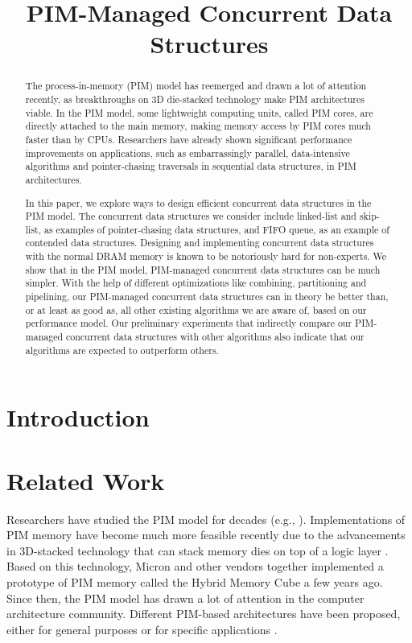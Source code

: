 \documentclass[11pt]{article}
\title{PIM-Managed Concurrent Data Structures}
\author{}
\date{}							%
\begin{document}
\maketitle

\begin{abstract}
The process-in-memory (PIM) model has reemerged and drawn a lot of attention recently, 
as breakthroughs on 3D die-stacked technology make PIM architectures viable. 
In the PIM model, some lightweight computing units, called PIM cores, are directly attached to 
the main memory, making memory access by PIM cores much faster than by CPUs. 
Researchers have already shown significant performance improvements on applications, 
such as embarrassingly parallel, data-intensive algorithms and 
pointer-chasing traversals in sequential data structures, in PIM architectures. 

In this paper, we explore ways to design efficient concurrent data structures in the PIM model. 
The concurrent data structures we consider include linked-list and skip-list, 
as examples of pointer-chasing data structures, 
and FIFO queue, as an example of contended data structures.  
Designing and implementing concurrent data structures with the normal DRAM memory 
is known to be notoriously hard for non-experts. 
We show that in the PIM model, PIM-managed concurrent data structures can be much simpler. 
With the help of different optimizations like combining, partitioning and pipelining, 
our PIM-managed concurrent data structures can in theory be better than, or at least as good as, 
all other existing algorithms we are aware of, based on our performance model. 
Our preliminary experiments that indirectly compare our PIM-managed concurrent data structures 
with other algorithms also indicate that our algorithms are expected to outperform others. 
\end{abstract}
\newpage

\section{Introduction}

\section{Related Work}
Researchers have studied the PIM model for decades (e.g., \cite{Stone1970, Kogge1994, 
Gokhale1995, Patterson1997, Oskin1998, KangHYKGLTP99, Hall1999}). 
Implementations of PIM memory have become much more feasible recently due to the advancements 
in 3D-stacked technology that can stack memory dies on top of a logic layer 
\cite{jeddeloh2012, Loh2008, Black2006}. 
Based on this technology, Micron and other vendors together implemented a prototype of 
PIM memory called the Hybrid Memory Cube \cite{website:HMC} a few years ago. 
Since then, the PIM model has drawn a lot of attention in the computer architecture community. 
Different PIM-based architectures have been proposed, either for general purposes or for 
specific applications \cite{Ahn2015:1, Ahn2015:2, Zhang2014:TTP, hsieh2016accelerating,
Azarkhish16, Akin2015:DRM, Azarkhish2015, AzarkhishPRLB17, boroumand2016, ZhuASSHPF13, ZhuGSPF13}.
\end{document}
